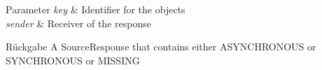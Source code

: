 \begin{DoxyParams}{Parameter}
{\em key} & Identifier for the objects \\
\hline
{\em sender} & Receiver of the response \\
\hline
\end{DoxyParams}
\begin{DoxyReturn}{Rückgabe}
A {\ttfamily Source\-Response} that contains either {\ttfamily A\-S\-Y\-N\-C\-H\-R\-O\-N\-O\-U\-S} or {\ttfamily S\-Y\-N\-C\-H\-R\-O\-N\-O\-U\-S} or {\ttfamily M\-I\-S\-S\-I\-N\-G} 
\end{DoxyReturn}

